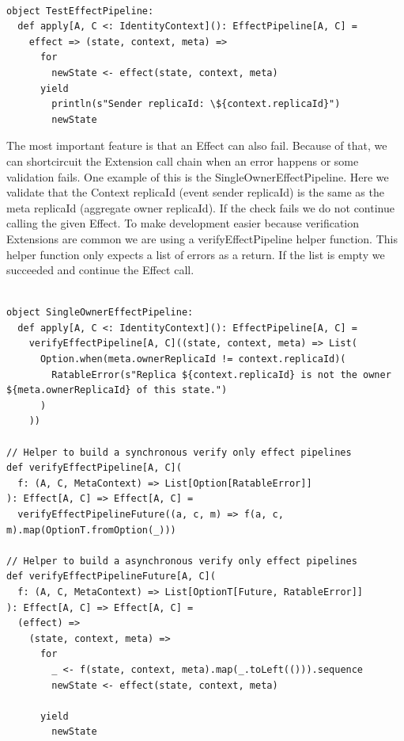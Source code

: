 \documentclass[
	ngerman,
	ruledheaders=section,   %
	class=report,		    %
	thesis={type=bachelor}, %
	accentcolor=9c,			%
	custommargins=true,    %
	marginpar=false,        %
	parskip=half-,          %
	fontsize=11pt,          %
]{tudapub}
\begin{document}
\begin{lstlisting}

object TestEffectPipeline:
  def apply[A, C <: IdentityContext](): EffectPipeline[A, C] =
    effect => (state, context, meta) => 
      for
        newState <- effect(state, context, meta)
      yield
        println(s"Sender replicaId: \${context.replicaId}")
        newState

\end{lstlisting}

The most important feature is that an Effect can also fail. Because of that, we can shortcircuit the Extension call chain when an error happens or some validation fails. One example of this is the SingleOwnerEffectPipeline. Here we validate that the Context replicaId (event sender replicaId) is the same as the meta replicaId (aggregate owner replicaId). If the check fails we do not continue calling the given Effect. To make development easier because verification Extensions are common we are using a verifyEffectPipeline helper function. This helper function only expects a list of errors as a return. If the list is empty we succeeded and continue the Effect call.

\begin{lstlisting}
  
object SingleOwnerEffectPipeline:
  def apply[A, C <: IdentityContext](): EffectPipeline[A, C] =
    verifyEffectPipeline[A, C]((state, context, meta) => List(
      Option.when(meta.ownerReplicaId != context.replicaId)(
        RatableError(s"Replica ${context.replicaId} is not the owner ${meta.ownerReplicaId} of this state.")
      )
    ))

// Helper to build a synchronous verify only effect pipelines
def verifyEffectPipeline[A, C](
  f: (A, C, MetaContext) => List[Option[RatableError]]
): Effect[A, C] => Effect[A, C] =
  verifyEffectPipelineFuture((a, c, m) => f(a, c, m).map(OptionT.fromOption(_)))
  
// Helper to build a asynchronous verify only effect pipelines
def verifyEffectPipelineFuture[A, C](
  f: (A, C, MetaContext) => List[OptionT[Future, RatableError]]
): Effect[A, C] => Effect[A, C] =
  (effect) =>
    (state, context, meta) => 
      for
        _ <- f(state, context, meta).map(_.toLeft(())).sequence
        newState <- effect(state, context, meta)

      yield
        newState

\end{lstlisting}
\end{document}
